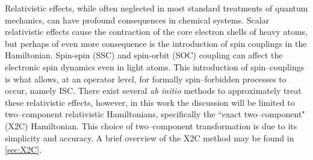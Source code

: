 Relativistic effects, while often neglected in most standard treatments of
quantum mechanics, can have profound consequences in chemical
systems.\cite{Pyykko12_45} Scalar relativistic effects cause the contraction of
the core electron shells of heavy atoms, but perhaps of even more consequence is
the introduction of spin couplings in the Hamiltonian.  Spin-spin (SSC) and
spin-orbit (SOC) coupling can affect the electronic spin dynamics even in light
atoms. 
This introduction of spin--couplings is what allows, at an
operator level, for formally spin--forbidden processes to occur, namely
ISC. 
There exist several \emph{ab
initio} methods to approximately treat these relativistic effects, however, in
this work the discussion will be limited to two--component relativistic
Hamiltonians, specifically the ``exact two--component" (X2C) Hamiltonian.
\cite{Liu05_241102,Peng06_044102,Saue07_064102,Peng09_031104,Reiher13_184105,Cheng07_104106,Liu16_204}
This choice of two--component transformation is due to its simplicity and
accuracy.  A brief overview of the X2C method may be found in \cref{sec:X2C}.

